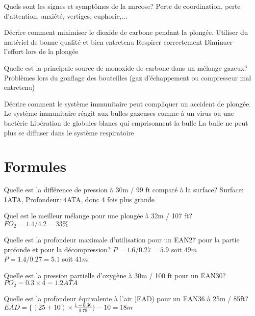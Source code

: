 \documentclass[english,12pt,a4paper]{article}
\begin{document}
\begin{outline}
		\1 Quels sont les signes et symptômes de la narcose?
			\2 Perte de coordination, perte d'attention, anxiété, vertiges, euphorie,...

		\1 Décrire comment minimiser le dioxide de carbone pendant la plongée.
			\2 Utiliser du matériel de bonne qualité et bien entretenu
			\2 Respirer correctement
			\2[-]	Diminuer l'effort lors de la plongée

		\1 Quelle est la principale source de monoxide de carbone dans un mélange gazeux?
			\2 Problèmes lors du gonflage des bouteilles (gaz d'échappement ou compresseur mal entretenu)

		\1 Décrire comment le système immunitaire peut compliquer un accident de plongée.
			\2 Le système immunitaire réagit aux bulles gazeuses comme à un virus ou une bactérie
			\2[-]	Libération de globules blancs qui emprisonnent la bulle
			\2[-]	La bulle ne peut plus se diffuser dans le système respiratoire
	\end{outline}
	\pagebreak

	\section{Formules}
	\begin{outline}
	\1 Quelle est la différence de pression à 30m / 99 ft comparé à la surface?
			\2 Surface: 1ATA, Profondeur: 4ATA, donc 4 fois plus grande

	\1 Quel est le meilleur mélange pour une plongée à 32m / 107 ft?
			\2 $FO_2 = 1.4/4.2 = 33\%$

	\1 Quelle est la profondeur maximale d'utilisation pour un EAN27 pour la partie profonde et pour la décompression?
			\2 $P = 1.6/0.27=5.9$ soit $49m$
			\2 $P = 1.4/0.27=5.1$ soit $41m$

	\1 Quelle est la pression partielle d'oxygène à 30m / 100 ft pour un EAN30?
			\2 $PO_2 = 0.3 \times 4 =1.2ATA$

	\1 Quelle est la profondeur équivalente à l'air (EAD) pour un EAN36 à 25m / 85ft?
			\2 $EAD= \{ (25+10)\times \frac{1-0.36}{0.79} \}-10 = 18m$
	\end{outline}
	\pagebreak

\end{document}
